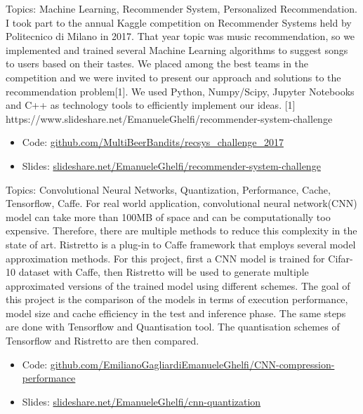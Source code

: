 \documentclass[11pt,a4paper,sans]{moderncv} %
\begin{document}
{
Topics: Machine Learning, Recommender System, Personalized Recommendation.
\newline{}
I took part to the annual Kaggle competition on Recommender Systems held by Politecnico di Milano in 2017. That year topic was music recommendation, so we implemented and trained several Machine Learning algorithms to suggest songs to users based on their tastes.
\newline{}
We placed among the best teams in the competition and we were invited to present our approach and solutions to the recommendation problem[1].
\newline{}
We used Python, Numpy/Scipy, Jupyter Notebooks and C++ as technology tools to efficiently implement our ideas.
\newline{}
[1] https://www.slideshare.net/EmanueleGhelfi/recommender-system-challenge
\begin{itemize}
	\item Code: \href{https://github.com/MultiBeerBandits/recsys\_challenge\_2017}{github.com/MultiBeerBandits/recsys\_challenge\_2017}
	\item Slides: \href{https://www.slideshare.net/EmanueleGhelfi/recommender-system-challenge}{slideshare.net/EmanueleGhelfi/recommender-system-challenge}
\end{itemize}
}


{
Topics: Convolutional Neural Networks, Quantization, Performance, Cache, Tensorflow, Caffe. 
\newline{}
For real world application, convolutional neural network(CNN) model can take more than 100MB of space and can be computationally too expensive. Therefore, there are multiple methods to reduce this complexity in the state of art. Ristretto is a plug-in to Caffe framework that employs several model approximation methods. For this project, first a CNN model is trained for Cifar-10 dataset with Caffe, then Ristretto will be used to generate multiple approximated versions of the trained model using different schemes. The goal of this project is the comparison of the models in terms of execution performance, model size and cache efficiency in the test and inference phase. The same steps are done with Tensorflow and Quantisation tool. The quantisation schemes of Tensorflow and Ristretto are then compared.
\newline{}
\begin{itemize}
	\item Code: \href{https://github.com/EmilianoGagliardiEmanueleGhelfi/CNN-compression-performance}{github.com/EmilianoGagliardiEmanueleGhelfi/CNN-compression-performance}
	\item Slides: \href{https://www.slideshare.net/EmanueleGhelfi/cnn-quantization}{slideshare.net/EmanueleGhelfi/cnn-quantization}
\end{itemize}
}
\end{document}
